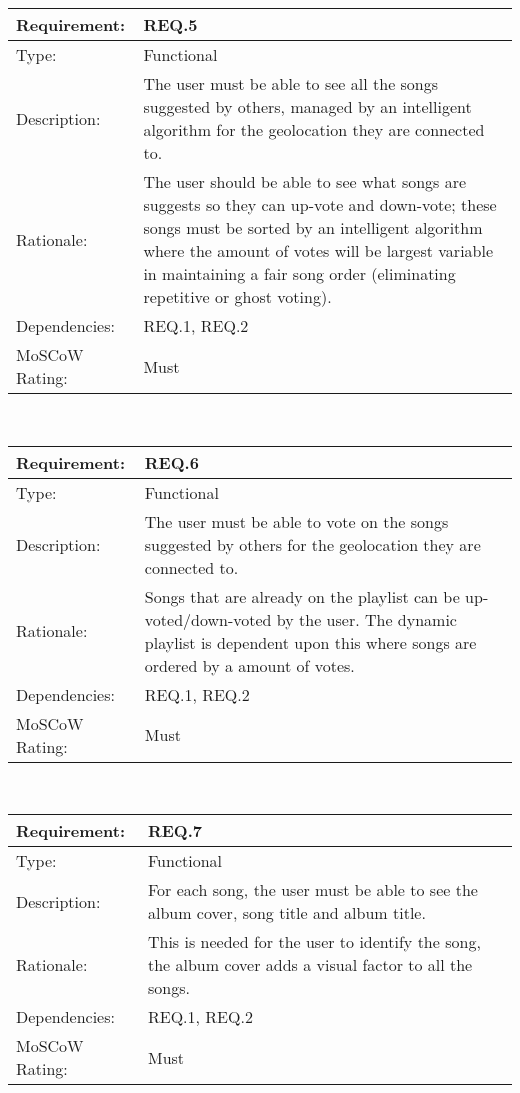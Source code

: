 \vspace{0.5cm}

\noindent
\begin{tabular}{|l || p{12.0cm}|}
  \hline
  Requirement:       & REQ.5 \\ \hline
  Type:              & Functional \\ \hline
  Description:       & The user must be able to see all the songs suggested by others, managed by an intelligent algorithm for the geolocation they are connected to.\\ \hline
  Rationale:         & The user should be able to see what songs are suggests so they can up-vote and down-vote; these songs must be sorted by an intelligent algorithm where the amount of votes will be largest variable in maintaining a fair song order (eliminating repetitive or ghost voting). \\ \hline
  Dependencies:      & REQ.1, REQ.2 \\ \hline
  MoSCoW Rating:     & Must \\
\hline
\end{tabular}\\

\vspace{0.5cm}

\noindent
\begin{tabular}{|l || p{12.0cm}|}
  \hline
  Requirement:       & REQ.6 \\ \hline
  Type:              & Functional \\ \hline
  Description:       & The user must be able to vote on the songs suggested by others for the geolocation they are connected to. \\ \hline
  Rationale:         & Songs that are already on the playlist can be up-voted/down-voted by the user. The dynamic playlist is dependent upon this where songs are ordered by a amount of votes. \\ \hline
  Dependencies:      & REQ.1, REQ.2 \\ \hline
  MoSCoW Rating:     & Must \\
\hline
\end{tabular}\\

\vspace{0.5cm}

\noindent
\begin{tabular}{|l || p{12.0cm}|}
  \hline
  Requirement:       & REQ.7 \\ \hline
  Type:              & Functional \\ \hline
  Description:       & For each song, the user must be able to see the album cover, song title and album title. \\ \hline
  Rationale:         & This is needed for the user to identify the song, the album cover adds a visual factor to all the songs. \\ \hline
  Dependencies:      & REQ.1, REQ.2 \\ \hline
  MoSCoW Rating:     & Must \\
\hline
\end{tabular}\\

